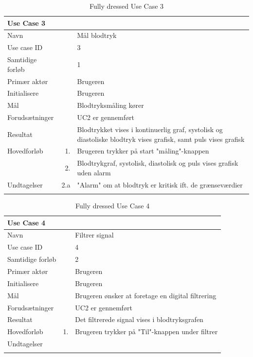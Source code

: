 \begin{longtabu} to  %
    {\large \textbf{Use Case 3}} && \\
    \toprule
    Navn &&    Mål blodtryk\\
    Use case ID &&    3\\
    Samtidige forløb &&    1\\
    Primær aktør &&    Brugeren\\
    Initialisere &&    Brugeren\\
    Mål && Blodtryksmåling kører\\
    Forudsætninger && UC2 er gennemført\\
    Resultat &&    Blodtrykket vises i kontinuerlig graf, systolisk og diastoliske blodtryk vises grafisk, samt puls vises grafisk                     \\ \midrule
    Hovedforløb &    1. &    Brugeren trykker på start "måling"\--knappen\\
    			& 	 2. & Blodtrykgraf, systolisk, diastolisk og puls vises grafisk uden alarm \\ \midrule               
    Undtagelser &    2.a & "Alarm" om at blodtryk er kritisk ift. de grænseværdier \\ \bottomrule
\caption{Fully dressed Use Case 3}
\label{UC3}
\end{longtabu}

\begin{longtabu} to  %
    {\large \textbf{Use Case 4}} && \\
    \toprule
    Navn &&    Filtrer signal\\
    Use case ID &&    4\\
    Samtidige forløb &&    2\\
    Primær aktør &&    Brugeren\\
    Initialisere &&    Brugeren\\
    Mål && Brugeren ønsker at foretage en digital filtrering\\
    Forudsætninger && UC2 er gennemført\\
    Resultat &&    Det filtrerede signal vises i blodtryksgrafen                    \\ \midrule
    Hovedforløb &    1. &    Brugeren trykker på "Til"\--knappen under filtrer\\ \midrule               
    Undtagelser &    \\ \bottomrule
\caption{Fully dressed Use Case 4}
\label{UC4}
\end{longtabu}

